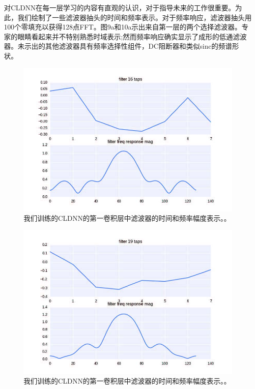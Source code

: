 对CLDNN在每一层学习的内容有直观的认识，对于指导未来的工作很重要。为此，我们绘制了一些滤波器抽头的时间和频率表示。对于频率响应，滤波器抽头用100个零填充以获得128点FFT。图9a和10a示出来自第一层的两个选择滤波器。专家的眼睛看起来并不特别熟悉时域表示;然而频率响应确实显示了成形的低通滤波器。未示出的其他滤波器具有频率选择性组件，DC阻断器和类似sinc的频谱形状。\par
\begin{figure}[!h]
	\centering
	\includegraphics[scale=1]{figures/chapter_5/fig9_a}
	\caption{我们训练的CLDNN的第一卷积层中滤波器的时间和频率幅度表示。。}
\end{figure}
\begin{figure}[!h]
	\centering
	\includegraphics[scale=1]{figures/chapter_5/fig10_a}
	\caption{我们训练的CLDNN的第一卷积层中滤波器的时间和频率幅度表示。。}
\end{figure}

